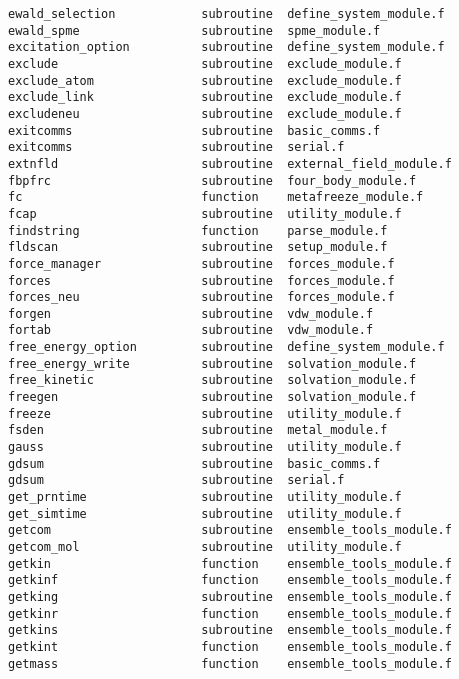 \begin{verbatim}
ewald_selection            subroutine  define_system_module.f    
ewald_spme                 subroutine  spme_module.f             
excitation_option          subroutine  define_system_module.f    
exclude                    subroutine  exclude_module.f          
exclude_atom               subroutine  exclude_module.f          
exclude_link               subroutine  exclude_module.f          
excludeneu                 subroutine  exclude_module.f          
exitcomms                  subroutine  basic_comms.f             
exitcomms                  subroutine  serial.f                  
extnfld                    subroutine  external_field_module.f   
fbpfrc                     subroutine  four_body_module.f        
fc                         function    metafreeze_module.f       
fcap                       subroutine  utility_module.f          
findstring                 function    parse_module.f            
fldscan                    subroutine  setup_module.f            
force_manager              subroutine  forces_module.f           
forces                     subroutine  forces_module.f           
forces_neu                 subroutine  forces_module.f           
forgen                     subroutine  vdw_module.f              
fortab                     subroutine  vdw_module.f              
free_energy_option         subroutine  define_system_module.f    
free_energy_write          subroutine  solvation_module.f        
free_kinetic               subroutine  solvation_module.f        
freegen                    subroutine  solvation_module.f        
freeze                     subroutine  utility_module.f          
fsden                      subroutine  metal_module.f            
gauss                      subroutine  utility_module.f          
gdsum                      subroutine  basic_comms.f             
gdsum                      subroutine  serial.f                  
get_prntime                subroutine  utility_module.f          
get_simtime                subroutine  utility_module.f          
getcom                     subroutine  ensemble_tools_module.f   
getcom_mol                 subroutine  utility_module.f          
getkin                     function    ensemble_tools_module.f   
getkinf                    function    ensemble_tools_module.f   
getking                    subroutine  ensemble_tools_module.f   
getkinr                    function    ensemble_tools_module.f   
getkins                    subroutine  ensemble_tools_module.f   
getkint                    function    ensemble_tools_module.f   
getmass                    function    ensemble_tools_module.f   

\end{verbatim}
